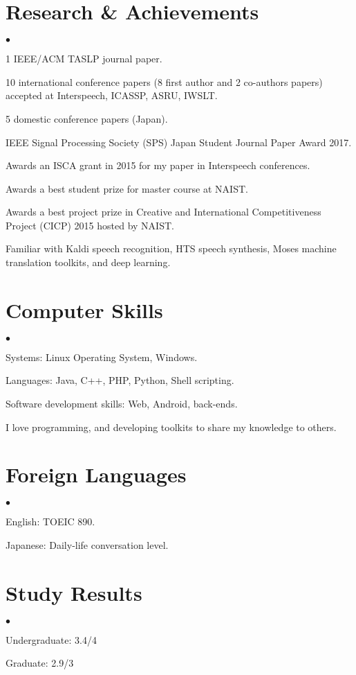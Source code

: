 \documentclass[margin,line]{res}
\newenvironment{list2}{
  \begin{list}{$\bullet$}{%
      \setlength{\itemsep}{0in}
      \setlength{\parsep}{0in} \setlength{\parskip}{0in}
      \setlength{\topsep}{0in} \setlength{\partopsep}{0in}
      \setlength{\leftmargin}{0.2in}}}{\end{list}}
\begin{document}
\begin{resume}
\section{\sc Research \& Achievements}
\begin{list2}
\item 1 IEEE/ACM TASLP journal paper.
\item 10 international conference papers (8 first author and 2 co-authors papers) accepted at Interspeech, ICASSP, ASRU, IWSLT.
\item 5 domestic conference papers (Japan).
\item IEEE Signal Processing Society (SPS) Japan Student Journal Paper Award 2017.
\item Awards an ISCA grant in 2015 for my paper in Interspeech conferences.
\item Awards a best student prize for master course at NAIST.
\item Awards a best project prize in Creative and International Competitiveness Project (CICP) 2015 hosted by NAIST.
\item Familiar with Kaldi speech recognition, HTS speech synthesis, Moses machine translation toolkits, and deep learning.
\end{list2}

\section{\sc Computer Skills }
\begin{list2}
\item Systems: Linux Operating System, Windows.
\item Languages: Java, C++, PHP, Python, Shell scripting.
\item Software development skills: Web, Android, back-ends.
\item I love programming, and developing toolkits to share my knowledge to others.
\end{list2}
\section{\sc Foreign Languages}
\begin{list2}
\item English: TOEIC 890.
\item Japanese: Daily-life conversation level.
\end{list2}
\section{\sc Study Results}
\begin{list2}
\item Undergraduate: 3.4/4
\item Graduate: 2.9/3
\end{list2}


\end{resume}
\end{document}
